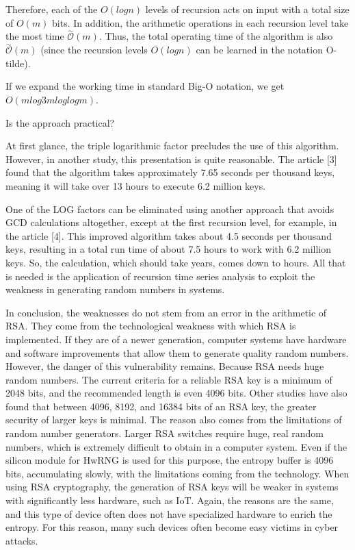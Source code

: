 \documentclass[runningheads]{llncs}
\begin{document}
Therefore, each of the $O (log n)$ levels of recursion acts on input with a total size of $O (m)$ bits. In addition, the arithmetic operations in each recursion level take the most time $\overset{\sim}{\mathcal{O}} (m)$. Thus, the total operating time of the algorithm is also $\overset{\sim}{\mathcal{O}} (m)$ (since the recursion levels $O (log n)$ can be learned in the notation O-tilde).

If we expand the working time in standard Big-O notation, we get $O (m log3 m log log m)$. 

Is the approach practical?

At first glance, the triple logarithmic factor precludes the use of this algorithm. However, in another study, this presentation is quite reasonable. The article [3] found that the algorithm takes approximately 7.65 seconds per thousand keys, meaning it will take over 13 hours to execute 6.2 million keys.

One of the LOG factors can be eliminated using another approach that avoids GCD calculations altogether, except at the first recursion level, for example, in the article [4]. This improved algorithm takes about 4.5 seconds per thousand keys, resulting in a total run time of about 7.5 hours to work with 6.2 million keys. So, the calculation, which should take years, comes down to hours. All that is needed is the application of recursion time series analysis to exploit the weakness in generating random numbers in systems.

In conclusion, the weaknesses do not stem from an error in the arithmetic of RSA. They come from the technological weakness with which RSA is implemented. If they are of a newer generation, computer systems have hardware and software improvements that allow them to generate quality random numbers. However, the danger of this vulnerability remains. Because RSA needs huge random numbers. The current criteria for a reliable RSA key is a minimum of 2048 bits, and the recommended length is even 4096 bits. Other studies have also found that between 4096, 8192, and 16384 bits of an RSA key, the greater security of larger keys is minimal. The reason also comes from the limitations of random number generators. Larger RSA switches require huge, real random numbers, which is extremely difficult to obtain in a computer system. Even if the silicon module for HwRNG is used for this purpose, the entropy buffer is 4096 bits, accumulating slowly, with the limitations coming from the technology. When using RSA cryptography, the generation of RSA keys will be weaker in systems with significantly less hardware, such as IoT. Again, the reasons are the same, and this type of device often does not have specialized hardware to enrich the entropy. For this reason, many such devices often become easy victims in cyber attacks.
\end{document}

